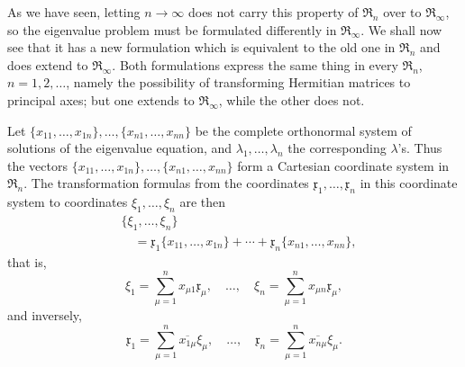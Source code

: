 \documentclass[fontsize=13pt,twoside,openany,headings=normal,parskip=false,bookmarkpackage=false,DIV=calc]{scrbook}
\begin{document}
As we have seen, letting $n\to\infty$ does not carry this property of $\mathfrak{R}_n$ over to $\mathfrak{R}_\infty$, so the eigenvalue problem must be formulated differently in $\mathfrak{R}_\infty$. We shall now see that it has a new formulation which is equivalent to the old one in $\mathfrak{R}_n$ and does extend to $\mathfrak{R}_\infty$. Both formulations express the same thing in every $\mathfrak{R}_n$, $n=1,2,\ldots$, namely the possibility of transforming Hermitian matrices to principal axes; but one extends to $\mathfrak{R}_\infty$, while the other does not.

Let $\{x_{11},\ldots,x_{1n}\},\ldots,\{x_{n1},\ldots,x_{nn}\}$ be the complete orthonormal system of solutions of the eigenvalue equation, and $\lambda_1,\ldots,\lambda_n$ the corresponding $\lambda$'s. Thus the vectors $\{x_{11},\ldots,x_{1n}\},\ldots,\{x_{n1},\ldots,x_{nn}\}$ form a Cartesian coordinate system in $\mathfrak{R}_n$. The transformation formulas from the coordinates $\mathfrak{x}_1,\ldots,\mathfrak{x}_n$ in this coordinate system to coordinates $\xi_1,\ldots,\xi_n$ are then
\begin{align*}
&\{\xi_1,\ldots,\xi_n\}\\
&\quad=\mathfrak{x}_1\{x_{11},\ldots,x_{1n}\}+\cdots+\mathfrak{x}_n\{x_{n1},\ldots,x_{nn}\},
\end{align*}
that is,
\[
\xi_1=\sum_{\mu=1}^n x_{\mu1}\mathfrak{x}_\mu,\quad\ldots,\quad
\xi_n=\sum_{\mu=1}^n x_{\mu n}\mathfrak{x}_\mu,
\]
and inversely,
\[
\mathfrak{x}_1=\sum_{\mu=1}^n\overline{x_{1\mu}}\xi_\mu,\quad\ldots,\quad
\mathfrak{x}_n=\sum_{\mu=1}^n\overline{x_{n\mu}}\xi_\mu.
\]
\end{document}
